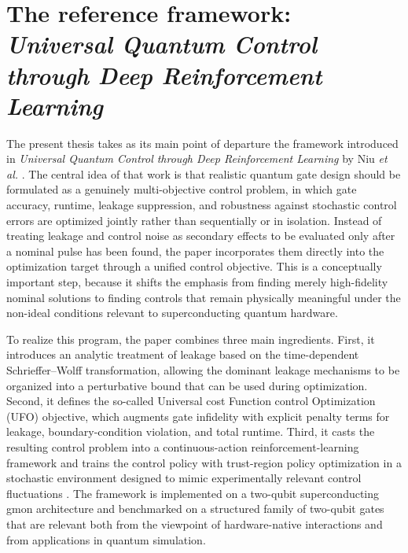 \section{The reference framework: \textit{Universal Quantum Control through Deep Reinforcement Learning}}
\label{subsec:intro_reference_framework}

The present thesis takes as its main point of departure the framework introduced in \textit{Universal Quantum Control through Deep Reinforcement Learning} by Niu \textit{et al.} \cite{Niu2019}. The central idea of that work is that realistic quantum gate design should be formulated as a genuinely multi-objective control problem, in which gate accuracy, runtime, leakage suppression, and robustness against stochastic control errors are optimized jointly rather than sequentially or in isolation. Instead of treating leakage and control noise as secondary effects to be evaluated only after a nominal pulse has been found, the paper incorporates them directly into the optimization target through a unified control objective. This is a conceptually important step, because it shifts the emphasis from finding merely high-fidelity nominal solutions to finding controls that remain physically meaningful under the non-ideal conditions relevant to superconducting quantum hardware.

To realize this program, the paper combines three main ingredients. First, it introduces an analytic treatment of leakage based on the time-dependent Schrieffer--Wolff transformation, allowing the dominant leakage mechanisms to be organized into a perturbative bound that can be used during optimization. Second, it defines the so-called Universal cost Function control Optimization (UFO) objective, which augments gate infidelity with explicit penalty terms for leakage, boundary-condition violation, and total runtime. Third, it casts the resulting control problem into a continuous-action reinforcement-learning framework and trains the control policy with trust-region policy optimization in a stochastic environment designed to mimic experimentally relevant control fluctuations \cite{Niu2019}. The framework is implemented on a two-qubit superconducting gmon architecture and benchmarked on a structured family of two-qubit gates that are relevant both from the viewpoint of hardware-native interactions and from applications in quantum simulation.

